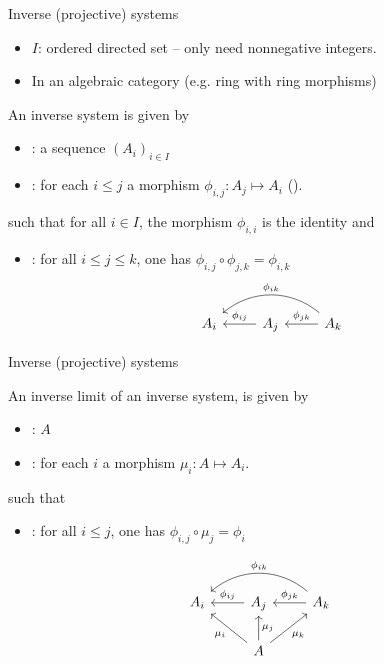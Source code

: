 \documentclass[compress,11pt]{beamer}
\renewcommand{\emph}[1]{{\color{red} #1}}
\begin{document}
\begin{frame}[fragile]{Inverse (projective) systems}

  \begin{itemize}
  \item $I$: ordered directed set -- only need nonnegative integers.
  \item In an algebraic category (e.g. ring with ring morphisms)
  \end{itemize}
  \begin{DEFN}
    An \emph{inverse system} is given by
    \begin{itemize}
    \item {}: a sequence $(A_i)_{i\in I}$
    \item {}: for each $i\leq j$ a morphism
      $\phi_{i,j}: A_j\mapsto A_i$ ().
    \end{itemize}
    such that for all $i\in I$, the morphism $\phi_{i,i}$ is the identity and
    \begin{itemize}
    \item {}: for all $i \leq j \leq k$, one has
      $\phi_{i,j} \circ \phi_{j,k} = \phi_{i,k}$
      \vskip-3mm
\[
\begin{tikzcd}%
  A_{i}
  & A_{j} \arrow[l,"\phi_{ij}",swap]
  & A_{k} \arrow[l,"\phi_{jk}",swap] \arrow[ll,"\phi_{ik}",bend
  right=40,swap]
\end{tikzcd}
\]
\end{itemize}
  \end{DEFN}
\end{frame}

\begin{frame}[fragile]{Inverse (projective) systems}

  \begin{DEFN}
    An \emph{inverse limit} of an inverse system, is given by
    \begin{itemize}
    \item {}: $A$
    \item {}: for each $i$ a morphism
      $\mu_{i}: A\mapsto A_i$.
    \end{itemize}
      such that
    \begin{itemize}
    \item {}: for all $i \leq j$, one has
      $\phi_{i,j} \circ \mu_{j} = \phi_{i}$
    \end{itemize}
  \end{DEFN}
\[
\begin{tikzcd}%
  A_{i}
  & A_{j} \arrow[l,"\phi_{ij}",swap]
  & A_{k} \arrow[l,"\phi_{jk}",swap] \arrow[ll,"\phi_{ik}",bend
  right=40,swap]\\
  & A \arrow[ul,"\mu_{i}"] \arrow[u,"\mu_{j}",swap]
  \arrow[ur,"\mu_{k}",swap]
\end{tikzcd}
\]

\end{frame}
\end{document}
